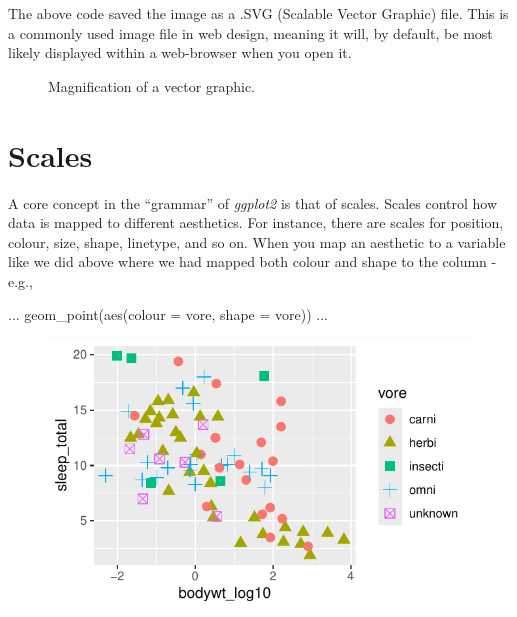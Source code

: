 \vspace{1em}

The above code saved the image as a .SVG (Scalable Vector Graphic) file. This is a commonly used image file in web design, meaning it will, by default, be most likely displayed within a web-browser when you open it.

\begin{figure}[H]
\centering

\caption{Magnification of a vector graphic.}
\end{figure}


\section{Scales}

A core concept in the ``grammar'' of \textit{ggplot2} is that of scales. Scales control how data is mapped to different aesthetics. For instance, there are scales for position, colour, size, shape, linetype, and so on. When you map an aesthetic to a variable like we did above where we had mapped both colour and shape to the  column - e.g.,

\begin{inR}
...
geom_point(aes(colour = vore, shape = vore))
...
\end{inR}

\vspace{2em}

\begin{figure}[H]
\includegraphics[scale = 0.75]{graphics/ch2Figs/ggEx_9.pdf}
\end{figure}

\vspace{1em}

